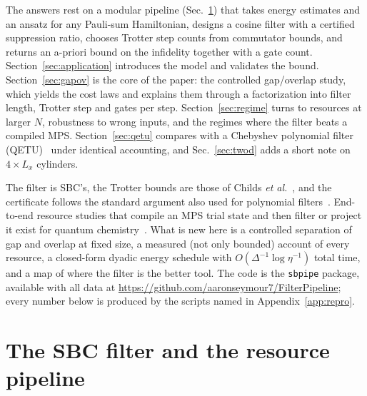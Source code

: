 \documentclass[aps,pra,twocolumn,superscriptaddress,nofootinbib]{revtex4-2}
\begin{document}
The answers rest on a modular pipeline (Sec.~\ref{sec:pipeline}) that takes energy estimates and an ansatz
for any Pauli-sum Hamiltonian, designs a cosine filter with a certified suppression ratio, chooses Trotter
step counts from commutator bounds, and returns an a-priori bound on the infidelity together with a gate
count. Section~\ref{sec:application} introduces the model and validates the bound. Section~\ref{sec:gapov}
is the core of the paper: the controlled gap/overlap study, which yields the cost laws and explains them
through a factorization into filter length, Trotter step and gates per step. Section~\ref{sec:regime}
turns to resources at larger $N$, robustness to wrong inputs, and the regimes where the filter beats a
compiled MPS. Section~\ref{sec:qetu} compares with a Chebyshev polynomial filter (QETU)~\cite{Dong2022}
under identical accounting, and Sec.~\ref{sec:twod} adds a short note on $4\times L_x$ cylinders.

The filter is SBC's, the Trotter bounds are those of Childs \emph{et al.}~\cite{Childs2021}, and the
certificate follows the standard argument also used for polynomial filters~\cite{Lin2020,Dong2022}.
End-to-end resource studies that compile an MPS trial state and then filter or project it exist for quantum
chemistry~\cite{Fomichev2024,Berry2025}. What is new here is a controlled separation of gap and overlap
at fixed size, a measured (not only bounded) account of every resource, a closed-form dyadic energy
schedule with $O(\Delta^{-1}\log\eta^{-1})$ total time, and a map of where the filter is the better tool.
The code is the \texttt{sbpipe} package, available with all data at
\url{https://github.com/aaronseymour7/FilterPipeline}; every number below is produced by the scripts named
in Appendix~\ref{app:repro}.

\section{The SBC filter and the resource pipeline}
\label{sec:pipeline}
\end{document}
